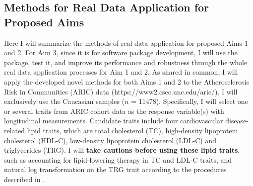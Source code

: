 \documentclass[12pt]{article}
\begin{document}
\subsection{Methods for Real Data Application for Proposed Aims}\label{sec:sub-RDAA}
Here I will summarize the methods of real data application for proposed Aims 1 and 2. For Aim 3, since it is for software package development, I will use the package, test it, and improve its performance and robustness through the whole real data application processes for Aim 1 and 2. As shared in common, I will apply the developed novel methods for both Aims 1 and 2 to the Atherosclerosis Risk in Communities (ARIC) data (https://www2.cscc.unc.edu/aric/). I will exclusively use the Caucasian samples ($n$ = 11478). Specifically, I will select one or several traits from ARIC cohort data as the response variable(s) with longitudinal measurements. Candidate traits include four cardiovascular disease-related lipid traits, which are total cholesterol (TC), high-density lipoprotein cholesterol (HDL-C), low-density lipoprotein cholesterol (LDL-C) and triglycerides (TRG). I will \textbf{take cautions before using these lipid traits}, such as accounting for lipid-lowering therapy in TC and LDL-C traits, and natural log transformation on the TRG trait according to the procedures described in \cite{Peloso2014}. 
\end{document}
